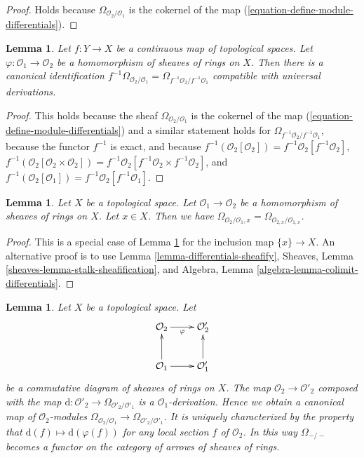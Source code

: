 \documentclass{stacks-project}
\theoremstyle{plain}
\newtheorem{lemma}[subsection]{Lemma}
\theoremstyle{definition}
\theoremstyle{remark}
\numberwithin{equation}{subsection}
\begin{document}
\begin{proof}
Holds because $\Omega_{\mathcal{O}_2/\mathcal{O}_1}$
is the cokernel of the map (\ref{equation-define-module-differentials}).
\end{proof}

\begin{lemma}
\label{lemma-pullback-differentials}
Let $f : Y \to X$ be a continuous map of topological spaces.
Let $\varphi : \mathcal{O}_1 \to \mathcal{O}_2$
be a homomorphism of sheaves of rings on $X$.
Then there is a canonical identification
$f^{-1}\Omega_{\mathcal{O}_2/\mathcal{O}_1} =
\Omega_{f^{-1}\mathcal{O}_2/f^{-1}\mathcal{O}_1}$
compatible with universal derivations.
\end{lemma}

\begin{proof}
This holds because the sheaf $\Omega_{\mathcal{O}_2/\mathcal{O}_1}$
is the cokernel of the map (\ref{equation-define-module-differentials})
and a similar statement holds for
$\Omega_{f^{-1}\mathcal{O}_2/f^{-1}\mathcal{O}_1}$,
because the functor $f^{-1}$ is exact, and because
$f^{-1}(\mathcal{O}_2[\mathcal{O}_2]) =
f^{-1}\mathcal{O}_2[f^{-1}\mathcal{O}_2]$,
$f^{-1}(\mathcal{O}_2[\mathcal{O}_2 \times \mathcal{O}_2]) =
f^{-1}\mathcal{O}_2[f^{-1}\mathcal{O}_2 \times f^{-1}\mathcal{O}_2]$, and
$f^{-1}(\mathcal{O}_2[\mathcal{O}_1]) =
f^{-1}\mathcal{O}_2[f^{-1}\mathcal{O}_1]$.
\end{proof}

\begin{lemma}
\label{lemma-stalk-module-differentials}
Let $X$ be a topological space. Let $\mathcal{O}_1 \to \mathcal{O}_2$
be a homomorphism of sheaves of rings on $X$. Let $x \in X$. Then we have
$\Omega_{\mathcal{O}_2/\mathcal{O}_1, x} =
\Omega_{\mathcal{O}_{2, x}/\mathcal{O}_{1, x}}$.
\end{lemma}

\begin{proof}
This is a special case of Lemma \ref{lemma-pullback-differentials}
for the inclusion map $\{x\} \to X$. An alternative proof is to use
Lemma \ref{lemma-differentials-sheafify},
Sheaves, Lemma \ref{sheaves-lemma-stalk-sheafification}, and
Algebra, Lemma \ref{algebra-lemma-colimit-differentials}.
\end{proof}

\begin{lemma}
\label{lemma-functoriality-differentials}
Let $X$ be a topological space. Let
$$
\xymatrix{
\mathcal{O}_2 \ar[r]_\varphi & \mathcal{O}_2' \\
\mathcal{O}_1 \ar[r] \ar[u] & \mathcal{O}'_1 \ar[u]
}
$$
be a commutative diagram of sheaves of rings on $X$. The map
$\mathcal{O}_2 \to \mathcal{O}'_2$ composed with the map
$\text{d} : \mathcal{O}'_2 \to \Omega_{\mathcal{O}'_2/\mathcal{O}'_1}$
is a $\mathcal{O}_1$-derivation. Hence we obtain a canonical map of
$\mathcal{O}_2$-modules
$\Omega_{\mathcal{O}_2/\mathcal{O}_1} \to
\Omega_{\mathcal{O}'_2/\mathcal{O}'_1}$.
It is uniquely characterized by the property that
$\text{d}(f) \mapsto \text{d}(\varphi(f))$
for any local section $f$ of $\mathcal{O}_2$.
In this way $\Omega_{-/-}$ becomes a functor on the category
of arrows of sheaves of rings.
\end{lemma}
\end{document}
